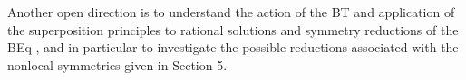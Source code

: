\documentclass[12pt]{article}
\begin{document}
Another open direction is to understand the action of the BT and application of the superposition
principles to rational solutions \cite{beq41,cl1,cl2,cld,beq35}  and symmetry reductions of the BEq 
\cite{beq15,beq19,beq40,beq39}, and in particular to investigate the possible
reductions associated with the nonlocal symmetries given in Section 5. 




\end{document}
